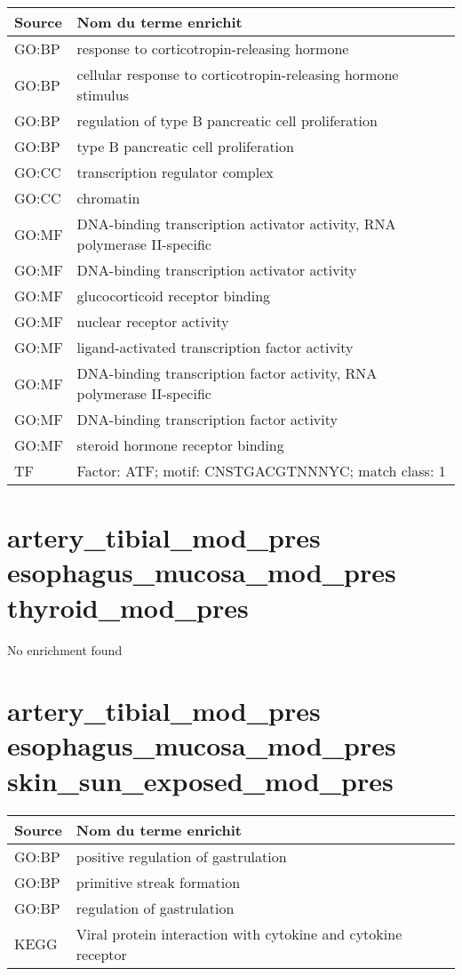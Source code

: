 \begin{longtable}{ll}
\toprule
Source & Nom du terme enrichit\\
\midrule
GO:BP & response to corticotropin-releasing hormone\\
GO:BP & cellular response to corticotropin-releasing hormone stimulus\\
GO:BP & regulation of type B pancreatic cell proliferation\\
GO:BP & type B pancreatic cell proliferation\\
GO:CC & transcription regulator complex\\
GO:CC & chromatin\\
GO:MF & DNA-binding transcription activator activity, RNA polymerase II-specific\\
GO:MF & DNA-binding transcription activator activity\\
GO:MF & glucocorticoid receptor binding\\
GO:MF & nuclear receptor activity\\
GO:MF & ligand-activated transcription factor activity\\
GO:MF & DNA-binding transcription factor activity, RNA polymerase II-specific\\
GO:MF & DNA-binding transcription factor activity\\
GO:MF & steroid hormone receptor binding\\
TF & Factor: ATF; motif: CNSTGACGTNNNYC; match class: 1\\
\bottomrule
\end{longtable}

\section*{artery\_tibial\_mod\_pres \newline esophagus\_mucosa\_mod\_pres \newline thyroid\_mod\_pres}
No enrichment found

\section*{artery\_tibial\_mod\_pres \newline esophagus\_mucosa\_mod\_pres \newline skin\_sun\_exposed\_mod\_pres}

\begin{longtable}{ll}
\toprule
Source & Nom du terme enrichit\\
\midrule
GO:BP & positive regulation of gastrulation\\
GO:BP & primitive streak formation\\
GO:BP & regulation of gastrulation\\
KEGG & Viral protein interaction with cytokine and cytokine receptor\\
\bottomrule
\end{longtable}

